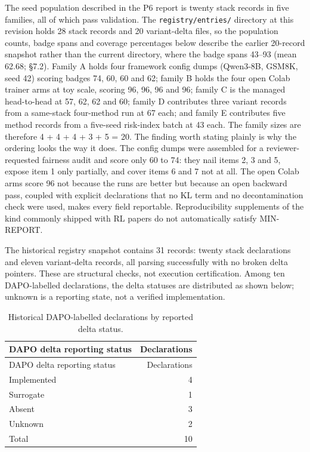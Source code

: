 \documentclass[12pt,a4paper]{report}
\begin{document}
The seed population described in the P6 report is twenty stack records
in five families, all of which pass validation. The
\texttt{registry/entries/} directory at this revision holds 28 stack
records and 20 variant-delta files, so the population counts, badge
spans and coverage percentages below describe the earlier 20-record
snapshot rather than the current directory, where the badge spans 43--93
(mean 62.68; §7.2). Family A holds four framework config dumps
(Qwen3-8B, GSM8K, seed 42) scoring badges 74, 60, 60 and 62; family B
holds the four open Colab trainer arms at toy scale, scoring 96, 96, 96
and 96; family C is the managed head-to-head at 57, 62, 62 and 60;
family D contributes three variant records from a same-stack four-method
run at 67 each; and family E contributes five method records from a
five-seed risk-index batch at 43 each. The family sizes are therefore 4
+ 4 + 4 + 3 + 5 = 20. The finding worth stating plainly is why the
ordering looks the way it does. The config dumps were assembled for a
reviewer-requested fairness audit and score only 60 to 74: they nail
items 2, 3 and 5, expose item 1 only partially, and cover items 6 and 7
not at all. The open Colab arms score 96 not because the runs are better
but because an open backward pass, coupled with explicit declarations
that no KL term and no decontamination check were used, makes every
field reportable. Reproducibility supplements of the kind commonly
shipped with RL papers do not automatically satisfy MIN-REPORT.

The historical registry snapshot contains 31 records: twenty stack
declarations and eleven variant-delta records, all parsing successfully
with no broken delta pointers. These are structural checks, not
execution certification. Among ten DAPO-labelled declarations, the delta
statuses are distributed as shown below; unknown is a reporting state,
not a verified implementation.

\begin{longtable}[]{@{}lr@{}}
\caption{Historical DAPO-labelled declarations by reported delta
status.}\tabularnewline
\toprule\noalign{}
DAPO delta reporting status & Declarations \\
\midrule\noalign{}
\endfirsthead
\toprule\noalign{}
DAPO delta reporting status & Declarations \\
\midrule\noalign{}
\endhead
\bottomrule\noalign{}
\endlastfoot
Implemented & 4 \\
Surrogate & 1 \\
Absent & 3 \\
Unknown & 2 \\
Total & 10 \\
\end{longtable}
\end{document}
